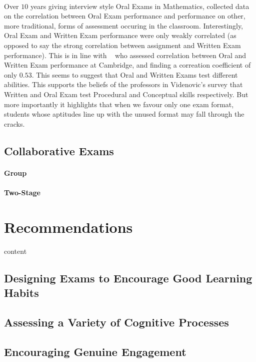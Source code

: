 \documentclass[12pt]{article}
\begin{document}
\paragraph{}
Over $10$ years giving interview style Oral Exams in Mathematics, \cite{boedigheimer2015individual} collected data on the correlation between Oral Exam performance and performance on other, more traditional, forms of assessment occuring in the classroom. Interestingly, Oral Exam and Written Exam performance were only weakly correlated (as opposed to say the strong correlation between assignment and Written Exam performance). This is in line with ~\cite{ahmed1999assessing} who assessed correlation between Oral and Written Exam performance at Cambridge, and finding a correation coefficient of only $0.53$. This seems to suggest that Oral and Written Exams test different abilities. This supports the beliefs of the professors in Videnovic's survey that Written and Oral Exam test Procedural and Conceptual skills respectively. But more importantly it highlights that when we favour only one exam format, students whose aptitudes line up with the unused format may fall through the cracks.
\subsection{Collaborative Exams}\label{subsec:collab}
\paragraph{Group}
\paragraph{Two-Stage}


\section{Recommendations}\label{sec:recommendations}
content
\subsection{Designing Exams to Encourage Good Learning Habits}
\subsection{Assessing a Variety of Cognitive Processes}
\subsection{Encouraging Genuine Engagement}
\nocite{*}


\end{document}
